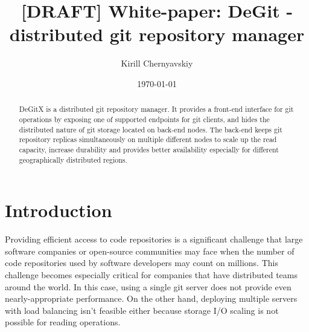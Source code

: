 \documentclass[acmlarge, screen, nonacm, 11pt]{acmart}
\date{\small\today}
\title[DeGit white paper]{[DRAFT] White-paper: DeGit - distributed git repository manager}
\author{Kirill Chernyavskiy}
\begin{document}
\raggedbottom

\begin{abstract}
  DeGitX is a distributed git repository manager.
  It provides a front-end interface for git operations by
  exposing one of supported endpoints for git clients, and
  hides the distributed nature of git storage located on back-end nodes.
  The back-end keeps git repository replicas simultaneously on
  multiple different nodes to scale up the read capacity,
  increase durability and provides better availability especially
  for different geographically distributed regions.
\end{abstract}

\maketitle

\section{Introduction}\label{sec:intro}

Providing efficient access to code repositories is a significant challenge
that large software companies or open-source communities may face when
the number of code repositories used by software developers may count
on millions. This challenge becomes especially critical for companies
that have distributed teams around the world.  In this case, using a single
git server does not provide even nearly-appropriate performance.
On the other hand, deploying multiple servers with load balancing
isn’t feasible either because storage I/O scaling is not possible
for reading operations.
\end{document}
